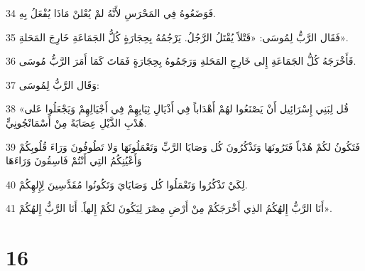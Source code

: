 \par 34 فَوَضَعُوهُ فِي المَحْرَسِ لأَنَّهُ لمْ يُعْلنْ مَاذَا يُفْعَلُ بِهِ.
\par 35 فَقَال الرَّبُّ لِمُوسَى: «قَتْلاً يُقْتَلُ الرَّجُلُ. يَرْجُمُهُ بِحِجَارَةٍ كُلُّ الجَمَاعَةِ خَارِجَ المَحَلةِ».
\par 36 فَأَخْرَجَهُ كُلُّ الجَمَاعَةِ إِلى خَارِجِ المَحَلةِ وَرَجَمُوهُ بِحِجَارَةٍ فَمَاتَ كَمَا أَمَرَ الرَّبُّ مُوسَى.
\par 37 وَقَال الرَّبُّ لِمُوسَى:
\par 38 «قُل لِبَنِي إِسْرَائِيل أَنْ يَصْنَعُوا لهُمْ أَهْدَاباً فِي أَذْيَالِ ثِيَابِهِمْ فِي أَجْيَالِهِمْ وَيَجْعَلُوا عَلى هُدْبِ الذَّيْلِ عِصَابَةً مِنْ أَسْمَانْجُونِيٍّ.
\par 39 فَتَكُونُ لكُمْ هُدْباً فَتَرُونَهَا وَتَذْكُرُونَ كُل وَصَايَا الرَّبِّ وَتَعْمَلُونَهَا وَلا تَطُوفُونَ وَرَاءَ قُلُوبِكُمْ وَأَعْيُنِكُمُ التِي أَنْتُمْ فَاسِقُونَ وَرَاءَهَا
\par 40 لِكَيْ تَذْكُرُوا وَتَعْمَلُوا كُل وَصَايَايَ وَتَكُونُوا مُقَدَّسِينَ لِإِلهِكُمْ.
\par 41 أَنَا الرَّبُّ إِلهُكُمُ الذِي أَخْرَجَكُمْ مِنْ أَرْضِ مِصْرَ لِيَكُونَ لكُمْ إِلهاً. أَنَا الرَّبُّ إِلهُكُمْ».

\chapter{16}

